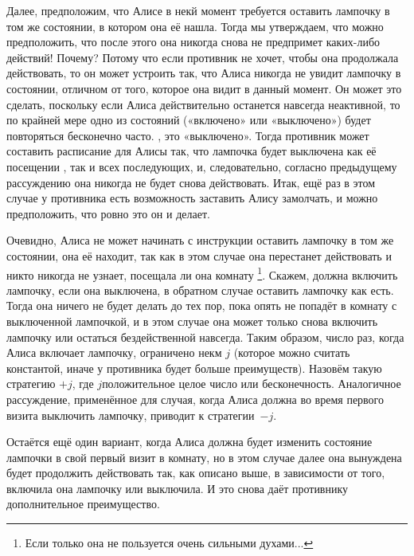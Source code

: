 \documentclass[twoside]{book}
\begin{document}
Далее, предположим, что Алисе в некй момент требуется оставить лампочку в том же состоянии, в котором она её нашла.
Тогда мы утверждаем, что можно предположить, что после этого она никогда снова не предпримет каких-либо действий!
Почему?
Потому что если противник не хочет, чтобы она продолжала действовать, то он может устроить так, что Алиса никогда не увидит лампочку в состоянии, отличном от того, которое она видит в данный момент.
Он может это сделать, поскольку если Алиса действительно останется навсегда неактивной, то по крайней мере одно из состояний («включено» или «выключено») будет повторяться бесконечно часто.
, это  «выключено».
Тогда противник может составить расписание для Алисы так, что лампочка будет выключена как  её посещении , так и  всех последующих, и, следовательно, согласно предыдущему рассуждению она никогда не будет снова действовать.
Итак, ещё раз в этом случае у противника есть возможность заставить Алису замолчать, и можно предположить, что ровно это он и делает.

Очевидно, Алиса не может начинать с инструкции оставить лампочку в том же состоянии,  она её находит, так как в этом случае она  перестанет действовать и никто никогда не узнает, посещала ли она комнату%
\footnote{Если только она не пользуется очень сильными духами...}.
Скажем,  должна включить лампочку, если она выключена,  в обратном случае оставить лампочку как есть.
Тогда она ничего не будет делать до тех пор, пока опять не попадёт в комнату с выключенной лампочкой, и в этом случае она может только снова включить лампочку или остаться бездейственной навсегда.
Таким образом, число раз, когда Алиса включает лампочку, ограничено некм $j$ (которое можно считать константой, иначе у противника будет больше преимуществ).
Назовём такую стратегию $+j$, где $j$положительное целое число или бесконечность.
Аналогичное рассуждение, применённое для случая, когда Алиса должна во время первого визита выключить лампочку, приводит к стратегии~$-j$.

Остаётся ещё один вариант, когда Алиса должна будет изменить состояние лампочки в свой первый визит в комнату, но в этом случае далее она вынуждена будет продолжить действовать так, как описано выше, в зависимости от того, включила она лампочку или выключила.
И это снова даёт противнику дополнительное преимущество.
\end{document}
